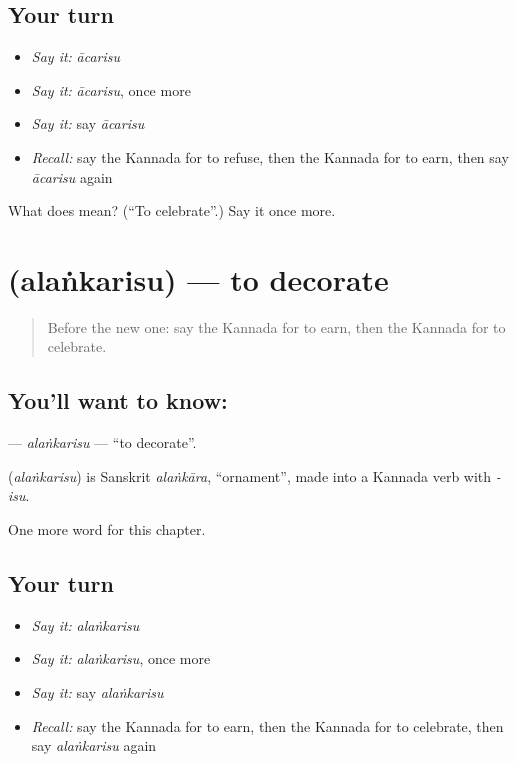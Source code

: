 \subsection*{Your turn}
\begin{itemize}
\raggedright
  \item \emph{Say it:} \emph{ācarisu}
  \item \emph{Say it:} \emph{ācarisu}, once more
  \item \emph{Say it:} say \emph{ācarisu}
  \item \emph{Recall:} say the Kannada for to refuse, then the Kannada for to earn, then say \emph{ācarisu} again
\end{itemize}

\begin{tcolorbox}[breakable,colback=teal!4,colframe=teal!35!black,title={Before you move on}]
What does  mean? (\textquotedblleft{}To celebrate\textquotedblright{}.) Say it once more.
\end{tcolorbox}
\section[\texorpdfstring{\kn{ಅಲಂಕರಿಸು} (alaṅkarisu)}{ಅಲಂಕರಿಸು (alaṅkarisu)}]{ (alaṅkarisu) — to decorate}

\label{lesson:KA-C239-alankarisu}



\begin{quote}
Before the new one: say the Kannada for to earn, then the Kannada for to celebrate.
\end{quote}

\subsection*{You'll want to know: }
\textbf{} — \emph{alaṅkarisu} — \textquotedblleft{}to decorate\textquotedblright{}.

\begin{cousinweb}
\textbf{} (\emph{alaṅkarisu}) is Sanskrit \emph{alaṅkāra}, \textquotedblleft{}ornament\textquotedblright{}, made into a Kannada verb with \emph{-isu}.
\end{cousinweb}

\begin{grammarlens}[title={What you've built}]
One more word for this chapter.
\end{grammarlens}

\subsection*{Your turn}
\begin{itemize}
\raggedright
  \item \emph{Say it:} \emph{alaṅkarisu}
  \item \emph{Say it:} \emph{alaṅkarisu}, once more
  \item \emph{Say it:} say \emph{alaṅkarisu}
  \item \emph{Recall:} say the Kannada for to earn, then the Kannada for to celebrate, then say \emph{alaṅkarisu} again
\end{itemize}

